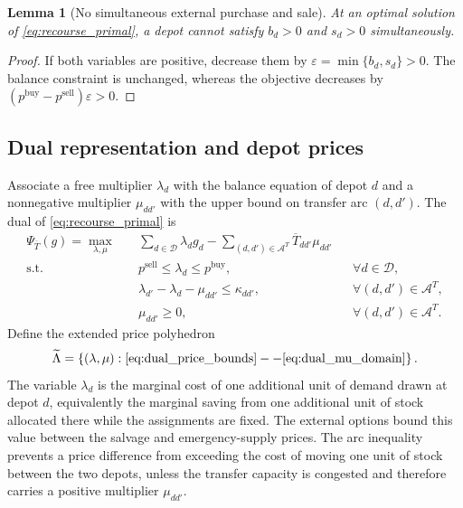 \documentclass[authoryear,final,3p,times]{elsarticle}
\newtheorem{lemma}{Lemma}
\theoremstyle{definition}
\theoremstyle{plain}
\begin{document}
\begin{lemma}[No simultaneous external purchase and sale]
\label{lem:no_simultaneous_trade}
At an optimal solution of \eqref{eq:recourse_primal}, a depot cannot satisfy
$b_d>0$ and $s_d>0$ simultaneously.
\end{lemma}

\begin{proof}
If both variables are positive, decrease them by
$\varepsilon=\min\{b_d,s_d\}>0$.  The balance constraint is unchanged, whereas
the objective decreases by
$(p^{\mathrm{buy}}-p^{\mathrm{sell}})\varepsilon>0$.
\end{proof}

\subsection{Dual representation and depot prices}
\label{subsec:price_polyhedron}

Associate a free multiplier $\lambda_d$ with the balance equation of depot
$d$ and a nonnegative multiplier $\mu_{dd'}$ with the upper bound on transfer
arc $(d,d')$.  The dual of \eqref{eq:recourse_primal} is
\begin{align}
\Psi_{\overline T}(g)=
\max_{\lambda,\mu}\quad&
\sum_{d\in\mathcal D}\lambda_d g_d
-\sum_{(d,d')\in\mathcal A^T}
 \overline T_{dd'}\mu_{dd'}
\label{eq:recourse_dual}\\
\text{s.t.}\quad&
p^{\mathrm{sell}}\le\lambda_d\le p^{\mathrm{buy}},
&&\forall d\in\mathcal D,
\label{eq:dual_price_bounds}\\
&\lambda_{d'}-\lambda_d-\mu_{dd'}\le\kappa_{dd'},
&&\forall(d,d')\in\mathcal A^T,
\label{eq:dual_transfer_arbitrage}\\
&\mu_{dd'}\ge0,
&&\forall(d,d')\in\mathcal A^T.
\label{eq:dual_mu_domain}
\end{align}
Define the extended price polyhedron
\begin{equation}
\widetilde\Lambda=
\left\{(\lambda,\mu):
\eqref{eq:dual_price_bounds}--\eqref{eq:dual_mu_domain}\right\}.
\label{eq:extended_price_polyhedron}
\end{equation}
The variable $\lambda_d$ is the marginal cost of one additional unit of demand
drawn at depot $d$, equivalently the marginal saving from one additional unit
of stock allocated there while the assignments are fixed.  The external options
bound this value between the salvage and emergency-supply prices.  The arc
inequality prevents a price difference from exceeding the cost of moving one
unit of stock between the two depots, unless the transfer capacity is congested
and therefore carries a positive multiplier $\mu_{dd'}$.
\end{document}

